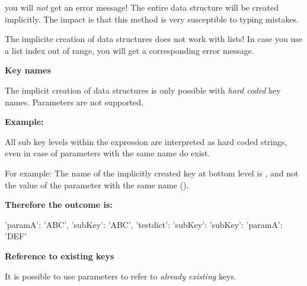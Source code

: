 you will \textit{not} get an error message! The entire data structure will be created implicitly. The impact is that this method
is very susceptible to typing mistakes.

The implicite creation of data structures does not work with lists! In case you use a list index out of range, you will get
a corresponding error message.


\newpage

\textbf{Key names}

The implicit creation of data structures is only possible with \textit{hard coded} key names. Parameters are not supported.

\vspace{2ex}

\textbf{Example:}


All sub key levels within the expression  are interpreted as hard coded strings, even in case of parameters with the same name do exist.

For example: The name of the implicitly created key at bottom level is , and not the value  of the parameter with the same name ().

\vspace{2ex}

\textbf{Therefore the outcome is:}

\begin{pythonlog}
{'paramA': 'ABC', 'subKey': 'ABC', 'testdict': {'subKey': {'subKey': {'paramA': 'DEF'}}}}
\end{pythonlog}

\vspace{2ex}

\textbf{Reference to existing keys}

It is possible to use parameters to refer to \textit{already existing} keys.


